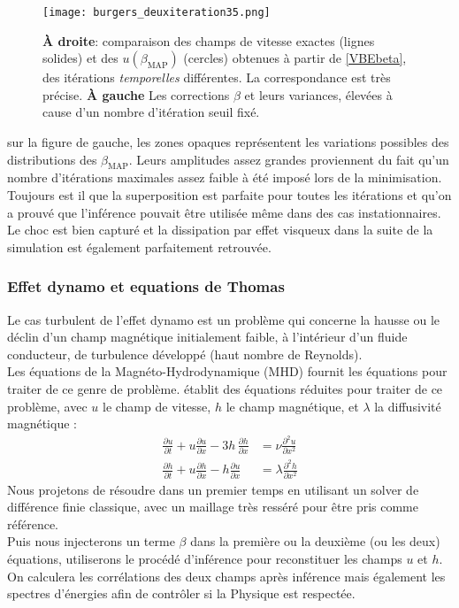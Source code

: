 \documentclass[a4paper,12pt]{article}
\newcommand{\bepar}[1]{
	\left( #1 \right)  
}
\newcommand{\bmap}{\beta_{\text{MAP}}}
\newcommand\bk{\color{black}}
\newcommand\dsb{\color{dsb}}
\numberwithin{equation}{section} %
\begin{document}
\begin{figure}[!ht]
\vspace{-5mm}
\centering
\texttt{[image: burgers\_deuxiteration35.png]}
\caption{\small{\textbf{À droite}: comparaison des champs de vitesse exactes (lignes solides) et des $u\bepar{\bmap}$ (cercles) obtenues à partir de \eqref{VBEbeta}, des itérations \textit{temporelles} différentes. La correspondance est très précise. \textbf{À gauche} Les corrections $\beta$ et leurs variances, élevées à cause d'un nombre d'itération seuil fixé.}}
\label{burger2it}
\end{figure}

\noindent sur la figure de gauche, les zones opaques représentent les variations possibles des distributions des $\bmap$. Leurs amplitudes assez grandes proviennent du fait qu'un nombre d'itérations maximales assez faible à été imposé lors de la minimisation.\\ 
Toujours est il que la superposition est parfaite pour toutes les itérations et qu'on a prouvé que l'inférence pouvait être utilisée même dans des cas instationnaires.\\
Le choc est bien capturé et la dissipation par effet visqueux dans la suite de la simulation est également parfaitement retrouvée.

\dsb \subsubsection{Effet dynamo et equations de Thomas} \bk
\noindent Le cas turbulent de l'effet dynamo est un problème qui concerne la hausse ou le déclin d'un champ magnétique initialement faible, à l'intérieur d'un fluide conducteur, de turbulence développé (haut nombre de Reynolds).\\
Les équations de la Magnéto-Hydrodynamique (MHD) fournit les équations pour traiter de ce genre de problème. \cite{thomas1968numerical} établit des équations réduites pour traiter de ce problème, avec $u$ le champ de vitesse, $h$ le champ magnétique, et $\lambda$ la diffusivité magnétique : 
\begin{align}
\frac{\partial u}{\partial t} + u \frac{\partial u}{\partial x} -3h\, \frac{\partial h}{\partial x} &= \nu \frac{\partial^2 u}{\partial x^2} \label{uthomas} \\[3mm]
\frac{\partial h}{\partial t} + u \frac{\partial h}{\partial x} - h \frac{\partial u}{\partial x} &= \lambda \frac{\partial^2 h}{\partial x^2} 
\end{align}
Nous projetons de résoudre dans un premier temps en utilisant un solver de différence finie classique, avec un maillage très resséré pour être pris comme référence.\\
Puis nous injecterons un terme $\beta$ dans la première ou la deuxième (ou les deux) équations, utiliserons le procédé d'inférence pour reconstituer les champs $u$ et $h$.\\ On calculera les corrélations des deux champs après inférence mais également les spectres d'énergies afin de contrôler si la Physique est respectée.\\
\end{document}
